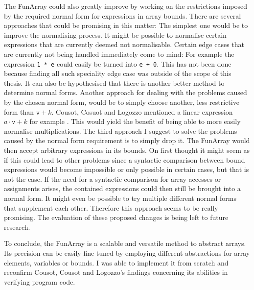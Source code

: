 The FunArray could also greatly improve by working on the restrictions imposed by the required normal form for expressions in array bounds. There are several approaches that could be promising in this matter: The simplest one would be to improve the normalising process. It might be possible to normalise certain expressions that are currently deemed not normalisable. Certain edge cases that are currently not being handled immediately come to mind: For example the expression \texttt{1 * e} could easily be turned into \texttt{e + 0}. This has not been done because finding all such speciality edge case was outside of the scope of this thesis. It can also be hypothesised that there is another better method to determine normal forms. Another approach for dealing with the problems caused by the chosen normal form, would be to simply choose another, less restrictive form than $\texttt{v}+k$. Cousot, Cosuot and Logozzo mentioned a linear expression $a\cdot\texttt{v}+k$ for example \cite{cousot2011}. This would yield the benefit of being able to more easily normalise multiplications. The third approach I suggest to solve the problems caused by the normal form requirement is to simply drop it. The FunArray would then accept arbitrary expressions in its bounds. On first thought it might seem as if this could lead to other problems since a syntactic comparison between bound expressions would become impossible or only possible in certain cases, but that is not the case. If the need for a syntactic comparison for array accesses or assignments arises, the contained expressions could then still be brought into a normal form. It might even be possible to try multiple different normal forms that supplement each other. Therefore this approach seems to be really promising. The evaluation of these proposed changes is being left to future research.

To conclude, the FunArray is a scalable and versatile method to abstract arrays. Its precision can be easily fine tuned by employing different abstractions for array elements, variables or bounds. I was able to implement it from scratch and reconfirm Cousot, Cousot and Logozzo's findings concerning its abilities in verifying program code.